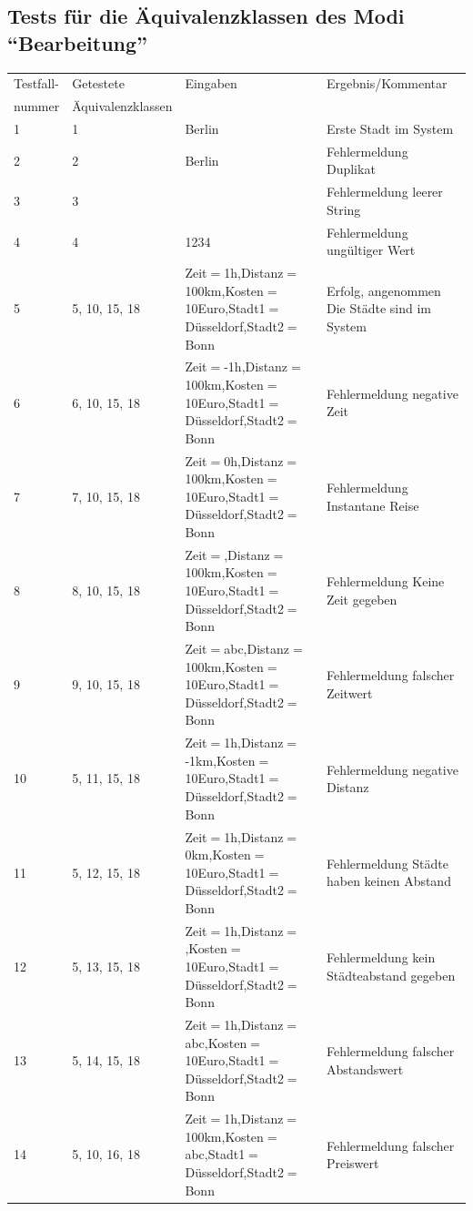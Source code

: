 \documentclass[a4paper]{report}
\begin{document}
\subsection*{Tests für die Äquivalenzklassen des Modi ``Bearbeitung''}
\begin{tabular}{l|l|l|l}
Testfall- 	& Getestete 		& Eingaben 	& Ergebnis/Kommentar\\
nummer		& Äquivalenzklassen	& 		&\\
\hline
1 		& 1			& Berlin	& Erste Stadt im System \\
2 		& 2			& Berlin	& Fehlermeldung Duplikat \\
3 		& 3			& \glqq\ \grqq  & Fehlermeldung leerer String\\
4 		& 4			& 1234		& Fehlermeldung ungültiger Wert \\
5 		& 5, 10, 15, 18		& Zeit$=$1h,Distanz$=$100km,Kosten$=$10Euro,Stadt1$=$Düsseldorf,Stadt2$=$Bonn & Erfolg, angenommen Die Städte sind im System\\
6 		& 6, 10, 15, 18		& Zeit$=$-1h,Distanz$=$100km,Kosten$=$10Euro,Stadt1$=$Düsseldorf,Stadt2$=$Bonn & Fehlermeldung negative Zeit\\
7 		& 7, 10, 15, 18		& Zeit$=$0h,Distanz$=$100km,Kosten$=$10Euro,Stadt1$=$Düsseldorf,Stadt2$=$Bonn & Fehlermeldung Instantane Reise\\
8 		& 8, 10, 15, 18		& Zeit$=$,Distanz$=$100km,Kosten$=$10Euro,Stadt1$=$Düsseldorf,Stadt2$=$Bonn & Fehlermeldung Keine Zeit gegeben\\
9 		& 9, 10, 15, 18		& Zeit$=$abc,Distanz$=$100km,Kosten$=$10Euro,Stadt1$=$Düsseldorf,Stadt2$=$Bonn & Fehlermeldung falscher Zeitwert\\
10 		& 5, 11, 15, 18		& Zeit$=$1h,Distanz$=$-1km,Kosten$=$10Euro,Stadt1$=$Düsseldorf,Stadt2$=$Bonn & Fehlermeldung negative Distanz\\
11 		& 5, 12, 15, 18		& Zeit$=$1h,Distanz$=$0km,Kosten$=$10Euro,Stadt1$=$Düsseldorf,Stadt2$=$Bonn & Fehlermeldung Städte haben keinen Abstand\\
12 		& 5, 13, 15, 18		& Zeit$=$1h,Distanz$=$,Kosten$=$10Euro,Stadt1$=$Düsseldorf,Stadt2$=$Bonn & Fehlermeldung kein Städteabstand gegeben\\
13 		& 5, 14, 15, 18		& Zeit$=$1h,Distanz$=$abc,Kosten$=$10Euro,Stadt1$=$Düsseldorf,Stadt2$=$Bonn & Fehlermeldung falscher Abstandswert\\
14 		& 5, 10, 16, 18		& Zeit$=$1h,Distanz$=$100km,Kosten$=$abc,Stadt1$=$Düsseldorf,Stadt2$=$Bonn & Fehlermeldung falscher Preiswert\\

\end{tabular}
\end{document}
